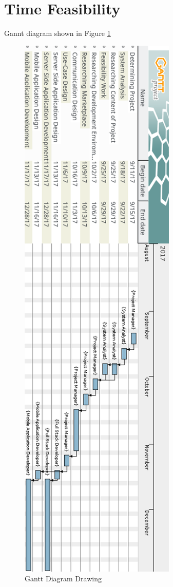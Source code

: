 \newpage
\section{Time Feasibility}
Gannt diagram shown in Figure \ref{fig:ganttDeneme}
\begin{figure}[!htbp]
\centering
\includegraphics[scale= 0.75]{projectChapters/images/gant.png}
\caption{Gantt Diagram Drawing}
\label{fig:ganttDeneme}
\end{figure}

